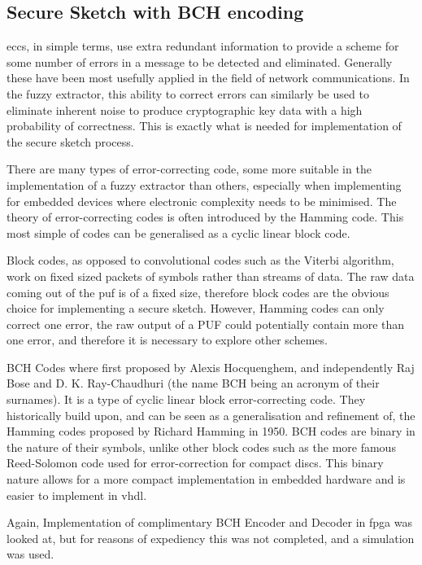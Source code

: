 \subsection{Secure Sketch with BCH encoding}

\Glspl{ecc}, in simple terms, use extra redundant information to
provide a scheme for some number of errors in a message to be detected and
eliminated. Generally these have been most usefully applied in the field of
network communications. In the fuzzy extractor, this ability to correct errors
can similarly be used to eliminate inherent noise to produce cryptographic key
data with a high probability of correctness. This is exactly what is needed for
implementation of the secure sketch process.

There are many types of error-correcting code, some more suitable in the
implementation of a fuzzy extractor than others, especially when implementing
for embedded devices where electronic complexity needs to be minimised.
The theory of error-correcting codes is often introduced by the Hamming code.
This most simple of codes can be generalised as a cyclic linear block code.

Block codes, as opposed to convolutional codes such as the Viterbi algorithm,
work on fixed sized packets of symbols rather than streams of data. The raw data
coming out of the \gls{puf} is of a fixed size, therefore block codes are the obvious
choice for implementing a secure sketch. However, Hamming codes can only correct
one error, the raw output of a PUF could potentially contain more than one
error, and therefore it is necessary to explore other schemes. 
 
BCH Codes where first proposed by Alexis Hocquenghem, and independently Raj Bose
and D. K. Ray-Chaudhuri (the name BCH being an acronym of their surnames).
It is a type of cyclic linear block error-correcting code. They historically
build upon, and can be seen as a generalisation and refinement of, the Hamming
codes proposed by Richard Hamming in 1950. BCH codes are binary in the nature
of their symbols, unlike other block codes such as the more famous Reed-Solomon
code used for error-correction for compact discs. This binary nature allows for
a more compact implementation in embedded hardware and is easier to implement
in \gls{vhdl}.

Again, Implementation of complimentary BCH Encoder and Decoder in \gls{fpga} was
looked at, but for reasons of expediency this was not completed, and a \matlab
simulation was used.

